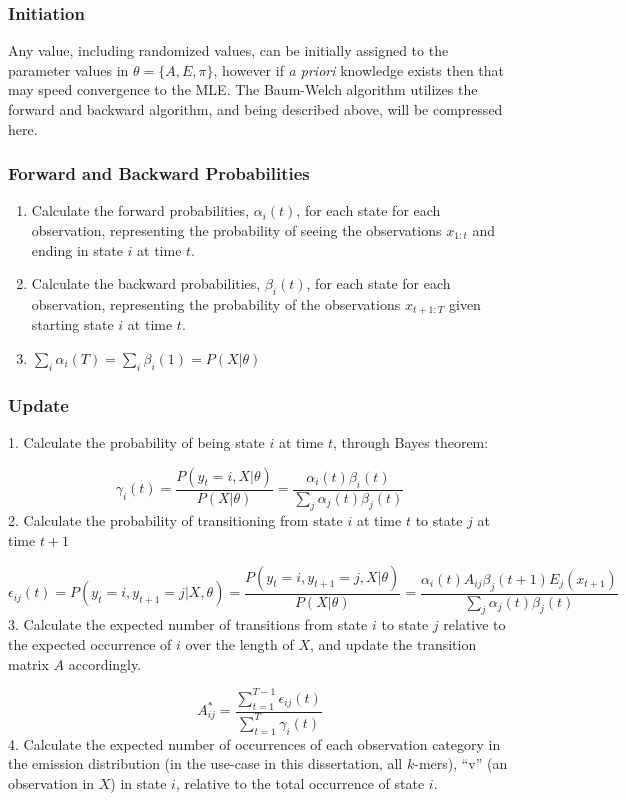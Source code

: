 \subsubsection{Initiation}
Any value, including randomized values, can be initially assigned to the parameter values in $\theta = \{A,E,\pi\}$, however if \textit{a priori} knowledge exists then that may speed convergence to the MLE. The Baum-Welch algorithm utilizes the forward and backward algorithm, and being described above, will be compressed here.

\subsubsection{Forward and Backward Probabilities }
\begin{enumerate}
\item Calculate the forward probabilities, $\alpha_i(t)$, for each state for each observation, representing the probability of seeing the observations $x_{1:t}$ and ending in state $i$ at time $t$. 
\item Calculate the backward probabilities, $\beta_i(t)$, for each state for each observation, representing the probability of the observations $x_{t+1:T}$ given starting state $i$ at time $t$. 
\item $\sum_i{\alpha_i(T)} = \sum_i{\beta_i(1)} = P(X|\theta)$       
\end{enumerate}

\subsubsection{Update}

1. Calculate the probability of being state $i$ at time $t$, through Bayes theorem: 

$$\gamma_i(t) = \frac{P(y_t = i,X|\theta)}{P(X|\theta)}= \frac{\alpha_i(t)\beta_i(t)}{\sum_j{\alpha_j(t)\beta_j(t)}}$$
2. Calculate the probability of transitioning from state $i$ at time $t$ to state $j$ at time $t+1$ 

$$\epsilon_{ij}(t) = P(y_t =i,y_{t+1}=j|X,\theta) = \frac{P(y_t = i,y_{t+1}=j,X|\theta)}{P(X|\theta)} = \frac{\alpha_i(t)A_{ij}\beta_j(t+1)E_j(x_{t+1})}{\sum_j{\alpha_j(t)\beta_j(t)}}$$ 
3. Calculate the expected number of transitions from state $i$ to state $j$ relative to the expected occurrence of $i$ over the length of $X$, and update the transition matrix $A$ accordingly. 

$$A_{ij}^* = \frac{\sum_{t=1}^{T-1}{\epsilon_{ij}(t)}}{\sum_{t=1}^{T}{\gamma_i(t)}}$$ 4. Calculate the expected number of occurrences of each observation category in the emission distribution (in the use-case in this dissertation, all $k$-mers), ``v'' (an observation in $X$) in state $i$, relative to the total occurrence of state $i$. 

